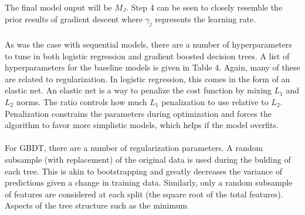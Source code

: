 \documentclass[11pt]{article}
\begin{document}
\begin{multicols*}{2}
                    The final model ouput will be $M_J$.
                    Step 4 can be seen to closely resemble the prior results of gradient descent where $\gamma_j$ represents the learning rate.
                    
                \vspace{-10pt}

                \paragraph{}
                    As was the case with sequential models, there are a number of hyperparameters to tune in both logistic regression and gradient boosted decision trees.
                    A list of hyperparameters for the baseline models is given in Table 4. 
                    Again, many of these are related to regularization. 
                    In logistic regression, this comes in the form of an elastic net. 
                    An elastic net is a way to penalize the cost function by mixing $L_1$ and $L_2$ norms. 
                    The ratio controls how much $L_1$ penalization to use relative to $L_2$. 
                    Penalization constrains the parameters during optimization and forces the algorithm to favor more simplistic models, which helps if the model overfits. 
                
                \vspace{-10pt}
                
                \paragraph{}
                    For GBDT, there are a number of regularization parameters. 
                    A random subsample (with replacement) of the original data is used during the bulding of each tree.
                    This is akin to bootstrapping and greatly decreases the variance of predictions given a change in training data. 
                    Similarly, only a random subsample of features are considered at each split (the square root of the total features).   
                    Aspects of the tree structure such as the minimum
                        
            \end{multicols*}
\end{document}
